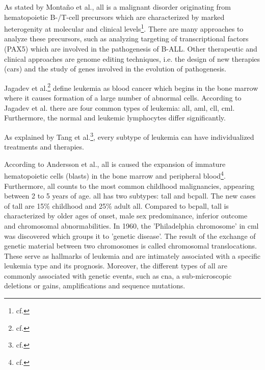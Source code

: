 As stated by Monta\~{n}o et al., \gls{all} is a malignant disorder originating from hematopoietic B-/T-cell precursors which are characterized by marked heterogenity at molecular and clinical levels\footnote{cf.\autocite{montano_2018}}. There are many approaches to analyze these precursors, such as analyzing targeting of transcriptional factors (PAX5) which are involved in the pathogenesis of B-ALL. Other therapeutic and clinical approaches are genome editing techniques, i.e. the design of new therapies (\gls{car}s) and the study of genes involved in the evolution of pathogenesis.

Jagadev et al.\footnote{cf.\autocite{jagadev}} define leukemia as blood cancer which begins in the bone marrow where it causes formation of a large number of abnormal cells. According to Jagadev et al. there are four common types of leukemia: \gls{all}, \gls{aml}, \gls{cll}, \gls{cml}. Furthermore, the normal and leukemic lymphocytes differ significantly.

As explained by Tang et al.\footnote{cf.\autocite{tang}}, every subtype of leukemia can have individualized treatments and therapies.

According to Andersson et al., \gls{all} is caused the expansion of immature hematopoietic cells (blasts) in the bone marrow and peripheral blood\footnote{cf.\autocite{andersson}}. Furthermore, \gls{all} counts to the most common childhood malignancies, appearing between 2 to 5 years of age. \gls{all} has two subtypes: \gls{tall} and \gls{bcpall}.
The new cases of \gls{tall} are 15\% childhood and 25\% adult \gls{all}. Compared to \gls{bcpall}, \gls{tall} is characterized by older ages of onset, male sex predominance, inferior outcome and chromosomal abnormabilities.
In 1960, the 'Philadelphia chromosome' in \gls{cml} was discovered which groups it to 'genetic disease'.
The result of the exchange of genetic material between two chromosomes is called chromosomal translocations. These serve as hallmarks of leukemia and are intimately associated with a specific leukemia type and its prognosis. Moreover, the different types of \gls{all} are commonly associated with genetic events, such as \gls{cna}, a sub-microscopic deletions or gains,  amplifications and sequence mutations.

